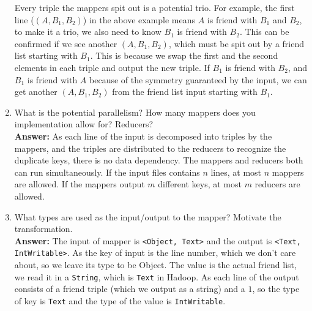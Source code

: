 \documentclass[letterpaper, 11pt]{article}
\begin{document}
\begin{enumerate}
\begin{itemize}
    \end{itemize}
    Every triple the mappers spit out is a potential trio. For example, the first line ($(A, B_1, B_2)$) in the above example means $A$ is friend with $B_1$ and $B_2$, to make it a trio, we also need to know $B_1$ is friend with $B_2$. This can be confirmed if we see another $(A, B_1, B_2)$, which must be spit out by a friend list starting with $B_1$. This is because we swap the first and the second elements in each triple and output the new triple. If $B_1$ is friend with $B_2$,
    and $B_1$ is friend with $A$ because of the symmetry guaranteed by the input, we can get another $(A, B_1, B_2)$ from the friend list input starting with $B_1$.\\

    \item What is the potential parallelism? How many mappers does you implementation allow for? Reducers?\\
    \textbf{Answer:} As each line of the input is decomposed into triples by the mappers, and the triples are distributed to the reducers to recognize the duplicate keys, there is no data dependency. The mappers and reducers both can run simultaneously. If the input files contains $n$ lines, at most $n$ mappers are allowed. If the mappers output $m$ different keys, at most $m$ reducers are allowed.

    \item What types are used as the input/output to the mapper? Motivate the transformation.\\
        \textbf{Answer:} The input of mapper is \texttt{<Object, Text>} and the output is \texttt{<Text, IntWritable>}. As the key of input is the line number, which we don't care about, so we leave its type to be Object. The value is the actual friend list, we read it in a \texttt{String}, which is \texttt{Text} in Hadoop. As each line of the output consists of a friend triple (which we output as a string) and a $1$, so the type of key is \texttt{Text} and the type of the value is
        \texttt{IntWritable}.

\end{enumerate}
\end{document}
